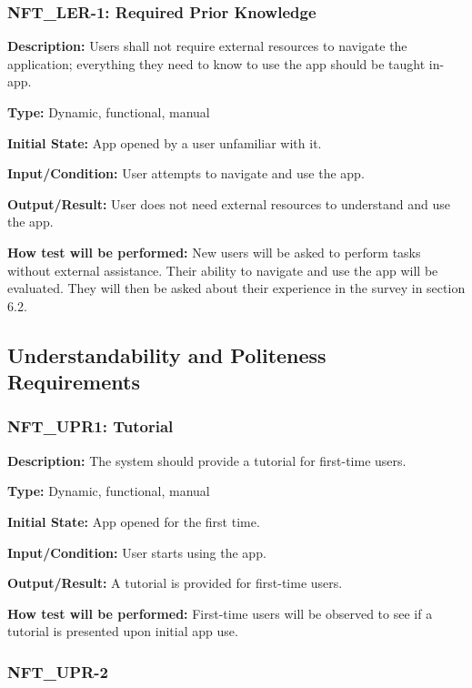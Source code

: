 \documentclass[12pt, titlepage]{article}
\begin{document}
\subsubsection*{\textbf{NFT\_LER-1: Required Prior Knowledge}
}

\textbf{Description: }Users shall not require external resources to navigate the application; everything they need to know to use the app should be taught in-app.

\textbf{Type:} Dynamic, functional, manual

\textbf{Initial State:} App opened by a user unfamiliar with it.

\textbf{Input/Condition: }User attempts to navigate and use the app.

\textbf{Output/Result:} User does not need external resources to understand and use the app.

\textbf{How test will be performed:} New users will be asked to perform tasks without external assistance. Their ability to navigate and use the app will be evaluated. They will then be asked about their experience in the survey in section 6.2. 
\newline
\subsection{Understandability and Politeness Requirements}


\subsubsection*{\textbf{NFT\_UPR1: Tutorial}
}

\textbf{Description: }The system should provide a tutorial for first-time users. 

\textbf{Type:} Dynamic, functional, manual

\textbf{Initial State:} App opened for the first time.

\textbf{Input/Condition: }User starts using the app.

\textbf{Output/Result: }A tutorial is provided for first-time users.

\textbf{How test will be performed: }First-time users will be observed to see if a tutorial is presented upon initial app use.


\subsubsection*{\textbf{NFT\_UPR-2}
}
\end{document}
